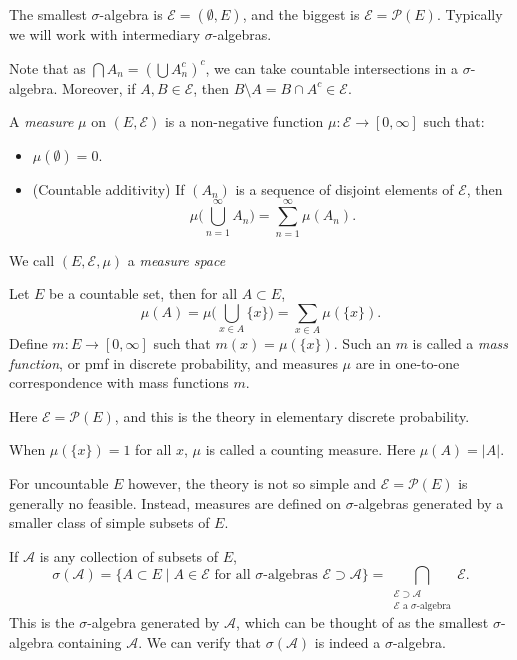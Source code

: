 \documentclass[12pt]{article}
\begin{document}
The smallest $\sigma$-algebra is $\mathcal{E} = (\emptyset, E)$, and the biggest is $\mathcal{E} = \mathcal{P}(E)$. Typically we will work with intermediary $\sigma$-algebras.

Note that as $\bigcap A_n = (\bigcup A_n^{c})^{c}$, we can take countable intersections in a $\sigma$-algebra. Moreover, if $A, B \in \mathcal{E}$, then $B \setminus A = B \cap A^{c} \in \mathcal{E}$.

\begin{definition}[Measures]
	A \emph{measure} $\mu$ on $(E,\mathcal{E})$ is a non-negative function $\mu : \mathcal{E} \to [0, \infty]$ such that:
	\begin{itemize}
		\item $\mu(\emptyset) = 0$.
		\item (Countable additivity) If $(A_n)$ is a sequence of disjoint elements of $\mathcal{E}$, then
			\[
			\mu \Biggl( \bigcup_{n=1}^{\infty} A_n \Biggr) = \sum_{n=1}^{\infty} \mu(A_n).
			\]
	\end{itemize}
	We call $(E, \mathcal{E}, \mu)$ a \emph{measure space}
\end{definition}

Let $E$ be a countable set, then for all $A \subset E$,
\[
	\mu(A) = \mu \Biggl( \bigcup_{x \in A} \{x\} \Biggr) = \sum_{x \in A} \mu(\{x\}).
\]
Define $m : E \to [0,\infty]$ such that $m(x) = \mu(\{x\})$. Such an $m$ is called a \emph{mass function}, or pmf in discrete probability, and measures $\mu$ are in one-to-one correspondence with mass functions $m$.

Here $\mathcal{E} = \mathcal{P}(E)$, and this is the theory in elementary discrete probability.

When $\mu(\{x\}) = 1$ for all $x$, $\mu$ is called a counting measure. Here $\mu(A) = |A|$.

For uncountable $E$ however, the theory is not so simple and $\mathcal{E} = \mathcal{P}(E)$ is generally no feasible. Instead, measures are defined on $\sigma$-algebras generated by a smaller class of simple subsets of $E$.

If $\mathcal{A}$ is any collection of subsets of $E$,
\[
	\sigma(\mathcal{A}) = \{A \subset E \mid A \in \mathcal{E} \text{ for all } \sigma\text{-algebras } \mathcal{E} \supset \mathcal{A}\} = \bigcap_{\substack{\mathcal{E} \supset \mathcal{A} \\ \mathcal{E}\text{ a } \sigma\text{-algebra}}} \mathcal{E}.
\]
This is the $\sigma$-algebra generated by $\mathcal{A}$, which can be thought of as the smallest $\sigma$-algebra containing $\mathcal{A}$. We can verify that $\sigma(\mathcal{A})$ is indeed a $\sigma$-algebra.
\end{document}
